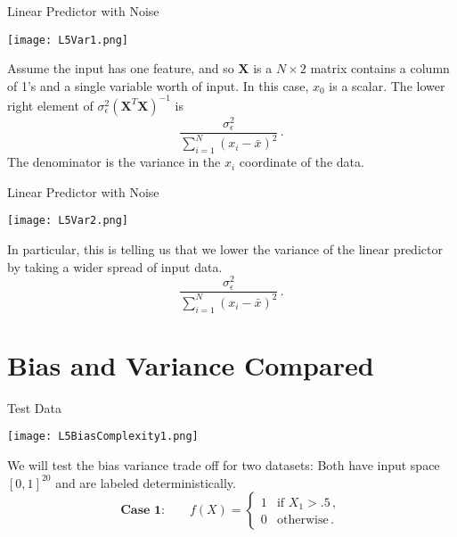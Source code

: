 \documentclass[10pt, table, dvipsnames,handout]{beamer}
\newcommand{\bfX}{\ensuremath{\mathbf{X}}}
\begin{document}
\begin{frame}[fragile]{Linear Predictor with Noise}
  \begin{minipage}[t][0.5\textheight][t]{\textwidth}
	  \centering \texttt{[image: L5Var1.png]}
  \end{minipage}
  \vfill
  \begin{minipage}[t][0.5\textheight][t]{\textwidth}
Assume the input has one feature, and so $\bfX$ is a $N\times 2$ matrix contains a column of 1's and a single variable worth of input. In this case, $x_0$ is a scalar. The lower right element of $\sigma^2_\epsilon (\bfX^T\bfX)^{-1}$ is
$$
\frac{\sigma^2_\epsilon}{\sum_{i=1}^N(x_i - \bar x)^2}\,.
$$\pause
The denominator is the variance in the $x_i$ coordinate of the data. 
\end{minipage}
\end{frame}





\begin{frame}[fragile]{Linear Predictor with Noise}
  \begin{minipage}[t][0.5\textheight][t]{\textwidth}
	  \centering \texttt{[image: L5Var2.png]}
  \end{minipage}
  \vfill
  \begin{minipage}[t][0.5\textheight][t]{\textwidth}
In particular, this is telling us that we lower the variance of the linear predictor by taking a wider spread of input data.
$$
\frac{\sigma^2_\epsilon}{\sum_{i=1}^N(x_i - \bar x)^2}\,.
$$
\end{minipage}
\end{frame}







\section{Bias and Variance Compared}




\begin{frame}[fragile]{Test Data}
  \begin{minipage}[t][0.5\textheight][t]{\textwidth}
	  \centering \texttt{[image: L5BiasComplexity1.png]}
  \end{minipage}
  \vfill
  \begin{minipage}[t][0.5\textheight][t]{\textwidth}
We will test the bias variance trade off for two datasets: Both have input space $[0,1]^{20}$ and are labeled deterministically.
$$
\textbf{Case 1:} \hspace{2em} f(X) = \begin{cases}
1&\text{if }X_1>.5\,,
\\
0&\text{otherwise}\,.
\end{cases}
$$
\end{minipage}
\end{frame}
\end{document}
